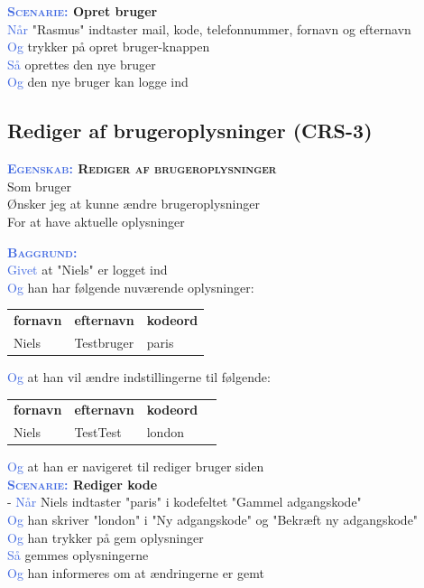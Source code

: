 \textbf{\textsc{\textcolor{RoyalBlue}{Scenarie:}} Opret bruger}\\
\textcolor{RoyalBlue}{Når} "Rasmus" indtaster mail, kode, telefonnummer, 
fornavn og efternavn \\
\textcolor{RoyalBlue}{Og} trykker på opret bruger-knappen\\
\textcolor{RoyalBlue}{Så} oprettes den nye bruger\\
\textcolor{RoyalBlue}{Og} den nye bruger kan logge ind\\

\subsection{Rediger af brugeroplysninger (CRS-3)} \label{sec:USRedigerBruger}
\textbf{\textsc{\textcolor{RoyalBlue}{Egenskab:} Rediger af brugeroplysninger}}\\
Som bruger\\
Ønsker jeg at kunne ændre brugeroplysninger\\
For at have aktuelle oplysninger

\textsc{\textcolor{RoyalBlue}{\textbf{Baggrund:}}}\\
\textcolor{RoyalBlue}{Givet} at "Niels" er logget ind\\
\textcolor{RoyalBlue}{Og} han har følgende nuværende oplysninger:\\
\begin{tabular}{| l | l | l |}
	\textbf{fornavn} & \textbf{efternavn} & \textbf{kodeord} \\
	Niels & Testbruger & paris \\
\end{tabular}
\newline \newline
\textcolor{RoyalBlue}{Og} at han vil ændre indstillingerne til følgende:\\
\begin{tabular}{| l | l | l | l |}
	\textbf{fornavn} & \textbf{efternavn} & \textbf{kodeord} \\
	Niels & TestTest & london \\
\end{tabular}
\newline \newline
\textcolor{RoyalBlue}{Og} at han er navigeret til rediger bruger siden \\

\textbf{\textsc{\textcolor{RoyalBlue}{Scenarie:}} Rediger kode}\\-
\textcolor{RoyalBlue}{Når} Niels indtaster "paris" i kodefeltet "Gammel adgangskode"\\
\textcolor{RoyalBlue}{Og} han skriver "london" i "Ny adgangskode" og "Bekræft ny adgangskode"\\
\textcolor{RoyalBlue}{Og} han trykker på gem oplysninger\\
\textcolor{RoyalBlue}{Så} gemmes oplysningerne\\
\textcolor{RoyalBlue}{Og} han informeres om at ændringerne er gemt

